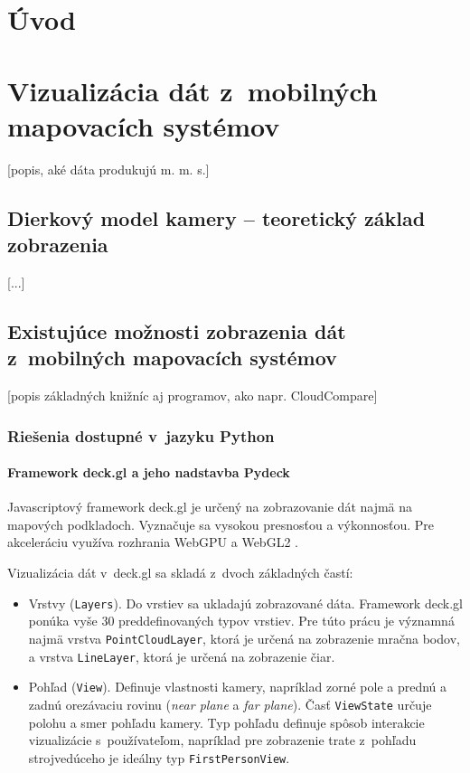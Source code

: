 %

\chapter{Úvod}

\chapter{Vizualizácia dát z~mobilných mapovacích systémov}

[popis, aké dáta produkujú m. m. s.]

\section{Dierkový model kamery -- teoretický základ zobrazenia}

[...]

\section{Existujúce možnosti zobrazenia dát z~mobilných mapovacích systémov}

[popis základných knižníc aj programov, ako napr. CloudCompare]

\subsection{Riešenia dostupné v~jazyku Python}

\subsubsection{Framework deck.gl a jeho nadstavba Pydeck}
\label{sec:deck_gl}

Javascriptový framework deck.gl je určený na zobrazovanie dát najmä na mapových podkladoch. Vyznačuje sa vysokou presnosťou a výkonnosťou. Pre akceleráciu využíva rozhrania WebGPU a WebGL2 \cite{deck.gl_documentation}.

Vizualizácia dát v~deck.gl sa skladá z~dvoch základných častí:
\begin{itemize}
    \item Vrstvy (\texttt{Layers}). Do vrstiev sa ukladajú zobrazované dáta. Framework deck.gl ponúka vyše 30 preddefinovaných typov vrstiev. Pre túto prácu je významná najmä vrstva \texttt{PointCloudLayer}, ktorá je určená na zobrazenie mračna bodov, a vrstva \texttt{LineLayer}, ktorá je určená na zobrazenie čiar.
    \item Pohľad (\texttt{View}). Definuje vlastnosti kamery, napríklad zorné pole a prednú a zadnú orezávaciu rovinu (\emph{near plane} a \emph{far plane}).
    Časť \texttt{ViewState} určuje polohu a smer pohľadu kamery. Typ pohľadu definuje spôsob interakcie vizualizácie s~používateľom, napríklad pre zobrazenie trate z~pohľadu strojvedúceho je ideálny typ \texttt{FirstPersonView}.
\end{itemize}

